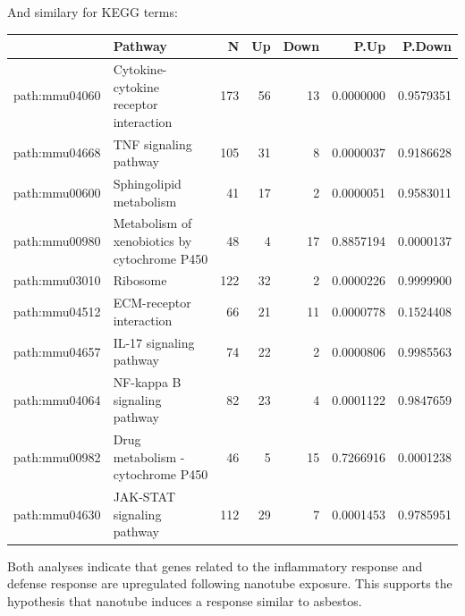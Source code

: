 \documentclass[9pt,a4paper,]{extarticle}
\newenvironment{Shaded}{\begin{snugshade}}{\end{snugshade}}
\newcommand{\KeywordTok}[1]{\textcolor[rgb]{0.13,0.29,0.53}{\textbf{{#1}}}}
\newcommand{\DataTypeTok}[1]{\textcolor[rgb]{0.13,0.29,0.53}{{#1}}}
\newcommand{\DecValTok}[1]{\textcolor[rgb]{0.00,0.00,0.81}{{#1}}}
\newcommand{\StringTok}[1]{\textcolor[rgb]{0.31,0.60,0.02}{{#1}}}
\newcommand{\CommentTok}[1]{\textcolor[rgb]{0.56,0.35,0.01}{\textit{{#1}}}}
\newcommand{\OtherTok}[1]{\textcolor[rgb]{0.56,0.35,0.01}{{#1}}}
\newcommand{\NormalTok}[1]{{#1}}
\begin{document}
And similary for KEGG terms:

\begin{Shaded}
\end{Shaded}

\begin{tabular}{l|l|r|r|r|r|r}
\hline
  & Pathway & N & Up & Down & P.Up & P.Down\\
\hline
path:mmu04060 & Cytokine-cytokine receptor interaction & 173 & 56 & 13 & 0.0000000 & 0.9579351\\
\hline
path:mmu04668 & TNF signaling pathway & 105 & 31 & 8 & 0.0000037 & 0.9186628\\
\hline
path:mmu00600 & Sphingolipid metabolism & 41 & 17 & 2 & 0.0000051 & 0.9583011\\
\hline
path:mmu00980 & Metabolism of xenobiotics by cytochrome P450 & 48 & 4 & 17 & 0.8857194 & 0.0000137\\
\hline
path:mmu03010 & Ribosome & 122 & 32 & 2 & 0.0000226 & 0.9999900\\
\hline
path:mmu04512 & ECM-receptor interaction & 66 & 21 & 11 & 0.0000778 & 0.1524408\\
\hline
path:mmu04657 & IL-17 signaling pathway & 74 & 22 & 2 & 0.0000806 & 0.9985563\\
\hline
path:mmu04064 & NF-kappa B signaling pathway & 82 & 23 & 4 & 0.0001122 & 0.9847659\\
\hline
path:mmu00982 & Drug metabolism - cytochrome P450 & 46 & 5 & 15 & 0.7266916 & 0.0001238\\
\hline
path:mmu04630 & JAK-STAT signaling pathway & 112 & 29 & 7 & 0.0001453 & 0.9785951\\
\hline
\end{tabular}

Both analyses indicate that genes related to the inflammatory response and defense response are upregulated following nanotube exposure. This supports the hypothesis that nanotube induces a response similar to asbestos.
\end{document}
